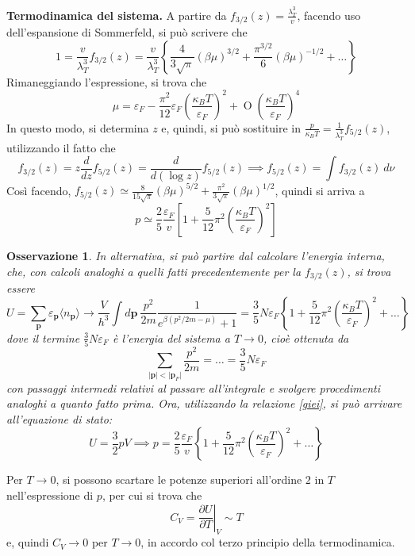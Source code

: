 \documentclass[11pt, a4paper]{scrartcl}
\theoremstyle{style}
\newtheorem{osservazione}{Osservazione}[section]
\theoremstyle{style1}
\newcommand*\Eval[3]{\left.#1\right\rvert_{#2}^{#3}}
\numberwithin{equation}{subsection}
\begin{document}
\textbf{Termodinamica del sistema.} A partire da $f_{3 / 2} (z) = \frac{\lambda _T^3}{v}$, facendo uso dell'espansione di Sommerfeld, si pu\`o scrivere che
\[
1 = \frac{v}{\lambda _T^3} f_{3 / 2} (z) = \frac{v}{\lambda _T^3} \left\{ \frac{4}{3 \sqrt{\pi} } (\beta \mu )^{3 / 2}  + \frac{\pi^{3 / 2} }{6} (\beta \mu )^{- 1 / 2}  + \ldots  \right\} 
\] 
Rimaneggiando l'espressione, si trova che
\begin{equation}\label{pf}
\mu  = \varepsilon _F - \frac{\pi^2}{12}\varepsilon _F \left(\frac{\kappa _B T}{\varepsilon _F}\right) ^2 + \operatorname{O} \left(\frac{\kappa _B T}{\varepsilon _F}\right) ^4
\end{equation}
In questo modo, si determina $z$ e, quindi, si pu\`o sostituire in $\frac{p}{\kappa _B T } = \frac{1}{\lambda _T^3}f_{5 / 2} (z)$, utilizzando il fatto che
\[
	f_{3/2} (z) = z \frac{d }{d z} f_{5 / 2} (z) = \frac{d }{d (\log z)} f_{5 / 2} (z) \implies f_{5 / 2} (z) = \int  f_{3 / 2} (z)\ d\nu
\] 
Cos\`i facendo, $f_{5 / 2} (z) \simeq \frac{8}{15 \sqrt{\pi} } (\beta \mu  )^{5 / 2} + \frac{\pi^2}{3 \sqrt{\pi} }(\beta \mu  ) ^{1 / 2} $, quindi si arriva a 
\[
p\simeq  \frac{2}{5}\frac{\varepsilon _F}{v}\left[ 1 + \frac{5}{12}\pi^2 \left(\frac{\kappa _B T}{\varepsilon _F}\right) ^2 \right]  
\] 
\begin{osservazione}
In alternativa, si pu\`o partire dal calcolare l'energia interna, che, con calcoli analoghi a quelli fatti precedentemente per la $f_{3 / 2} (z)$, si trova essere
\[
U = \sum_{\mathbf{p} }^{} \varepsilon _\mathbf{p}  \langle n_\mathbf{p}  \rangle \longrightarrow \frac{V}{h^3}\int d\mathbf{p}  \ \frac{p^2}{2m}\frac{1}{e^{\beta \left(p^2 / 2m - \mu \right) }+1} = \frac{3}{5}N \varepsilon _F \left\{ 1 + \frac{5}{12}\pi^2 \left(\frac{\kappa _B T}{\varepsilon _F}\right) ^2+\ldots \right\} 
\] 
dove il termine $\frac{3}{5}N \varepsilon _F$ \`e l'energia del sistema a $T\to 0$, cio\`e ottenuta da 
\[
\sum_{\lvert \mathbf{p}  \rvert < \lvert \mathbf{p} _F \rvert }^{} \frac{p^2}{2m} = \ldots = \frac{3}{5}N\varepsilon _F
\] 
con passaggi intermedi relativi al passare all'integrale e svolgere procedimenti analoghi a quanto fatto prima.
Ora, utilizzando la relazione \ref{giei}, si pu\`o arrivare all'equazione di stato:
\[
U = \frac{3}{2}pV \implies p = \frac{2}{5}\frac{\varepsilon _F}{v} \left\{ 1 + \frac{5}{12}\pi^2 \left(\frac{\kappa _B T}{\varepsilon _F}\right) ^2 + \ldots \right\} 
\] 
\end{osservazione}
\noindent Per $T\to 0$, si possono scartare le potenze superiori all'ordine $2$ in $T$ nell'espressione di $p$, per cui si trova che 
\[
	C_V = \Eval{\frac{\partial U}{\partial T} }{V}{} \sim T
\] 
e, quindi $C_V \to 0$ per $T\to 0$, in accordo col terzo principio della termodinamica. 
\end{document}
